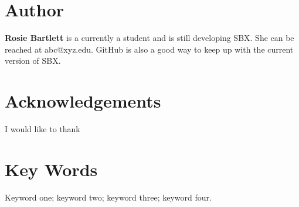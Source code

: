 \documentclass{hehe}
\begin{document}
\printbibliography

\section*{Author}
\begin{authorbio}

\textbf{Rosie Bartlett} is a currently a student and is still developing SBX. She can be reached at abc@xyz.edu. GitHub is also a good way to keep up with the current version of SBX.
\end{authorbio}

\section*{Acknowledgements}
I would like to thank

\section*{Key Words}
Keyword one; keyword two; keyword three; keyword four.
\end{document}
